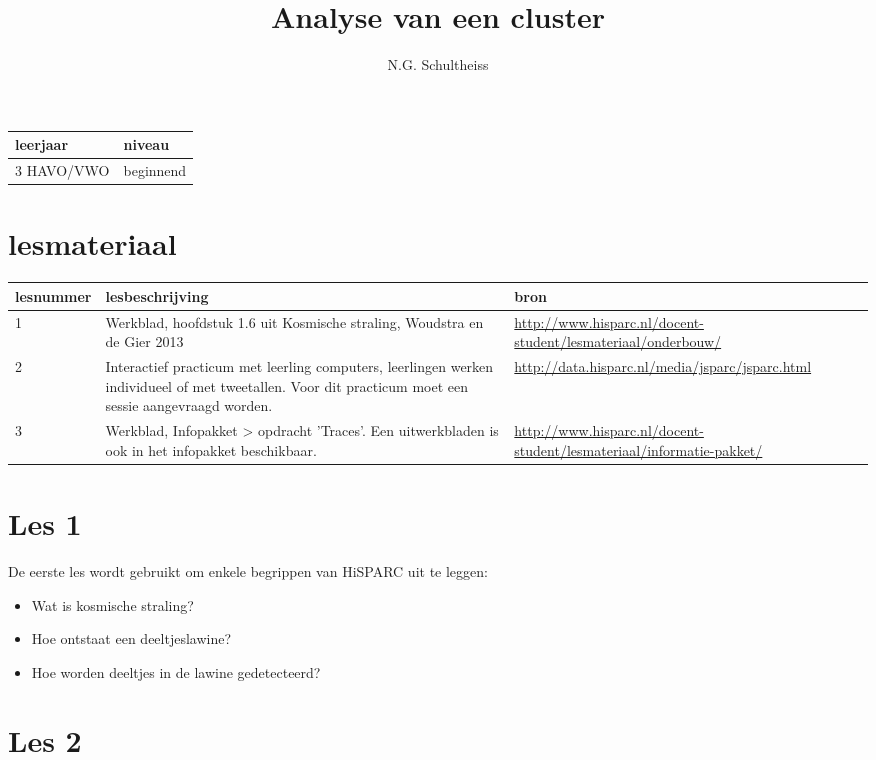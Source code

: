 

\title{Analyse van een cluster}
\author{N.G. Schultheiss}



\maketitle

\begin{tabular}{|>{\raggedright}p{3cm}|>{\raggedright}p{12cm}|}
\hline
leerjaar & niveau \tabularnewline
\hline
3 HAVO/VWO & beginnend \tabularnewline
\hline
\end{tabular}

\section{lesmateriaal}

\begin{tabular}{ |>{\raggedright}p{2.5cm}|>{\raggedright}p{8cm}|>{\raggedright}p{4cm}|}
\hline
lesnummer & lesbeschrijving & bron \tabularnewline
\hline
1 & 
Werkblad, hoofdstuk 1.6 uit Kosmische straling, Woudstra en de Gier 2013 & 
\url{http://www.hisparc.nl/docent-student/lesmateriaal/onderbouw/} \tabularnewline
\hline
2 & 
Interactief practicum met leerling computers, leerlingen werken individueel of met tweetallen. Voor dit practicum moet een sessie aangevraagd worden. &
\url{http://data.hisparc.nl/media/jsparc/jsparc.html} \tabularnewline
\hline
3 & 
Werkblad, Infopakket > opdracht 'Traces'. Een uitwerkbladen is ook in het infopakket beschikbaar. & 
\url{http://www.hisparc.nl/docent-student/lesmateriaal/informatie-pakket/} \tabularnewline
\hline
\end{tabular}

\section{Les 1}

De eerste les wordt gebruikt om enkele begrippen van HiSPARC uit te leggen:

\begin{itemize}
\item Wat is kosmische straling?
\item Hoe ontstaat een deeltjeslawine?
\item Hoe worden deeltjes in de lawine gedetecteerd?
\end{itemize}

\section{Les 2}

